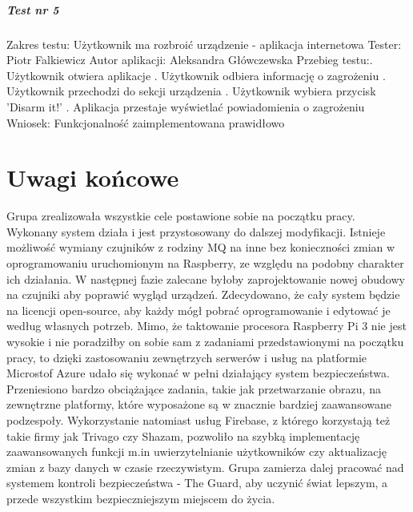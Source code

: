  \paragraph{Test nr 5}
Zakres testu:\newline
Użytkownik ma rozbroić urządzenie - aplikacja internetowa\newline
Tester: Piotr Falkiewicz \newline
Autor aplikacji: Aleksandra Główczewska \newline
Przebieg testu:. Użytkownik otwiera aplikacje . Użytkownik odbiera informację o zagrożeniu . Użytkownik przechodzi do sekcji urządzenia . Użytkownik wybiera przycisk 'Disarm it!' . Aplikacja przestaje wyświetlać powiadomienia o zagrożeniu \newline
Wniosek:\newline
Funkcjonalność zaimplementowana prawidłowo\newline
\newline

\chapter{Uwagi końcowe}

Grupa zrealizowała wszystkie cele postawione sobie na początku pracy. Wykonany system działa i jest przystosowany do dalszej modyfikacji. Istnieje możliwość wymiany czujników z rodziny MQ na inne bez konieczności zmian w oprogramowaniu uruchomionym na Raspberry, ze względu na podobny charakter ich działania. W następnej fazie zalecane byłoby zaprojektowanie nowej obudowy na czujniki aby poprawić wygląd urządzeń. Zdecydowano, że cały system będzie na licencji open-source, aby każdy mógł pobrać oprogramowanie i edytować je według własnych potrzeb. Mimo, że taktowanie procesora Raspberry Pi 3 nie jest wysokie i nie poradziłby on sobie sam z zadaniami przedstawionymi na początku pracy, to dzięki zastosowaniu zewnętrzych serwerów i usług na platformie Microstof Azure udało się wykonać w pełni działający system bezpieczeństwa. Przeniesiono bardzo obciążające zadania, takie jak przetwarzanie obrazu, na zewnętrzne platformy, które wyposażone są w znacznie bardziej zaawansowane podzespoły. Wykorzystanie natomiast usług Firebase, z którego korzystają też takie firmy jak Trivago czy Shazam, pozwoliło na szybką implementację zaawansowanych funkcji m.in uwierzytelnianie użytkowników czy aktualizację zmian z bazy danych w czasie rzeczywistym. 
Grupa zamierza dalej pracować nad systemem kontroli bezpieczeństwa - The Guard, aby uczynić świat lepszym, a przede wszystkim bezpieczniejszym miejscem do życia.
